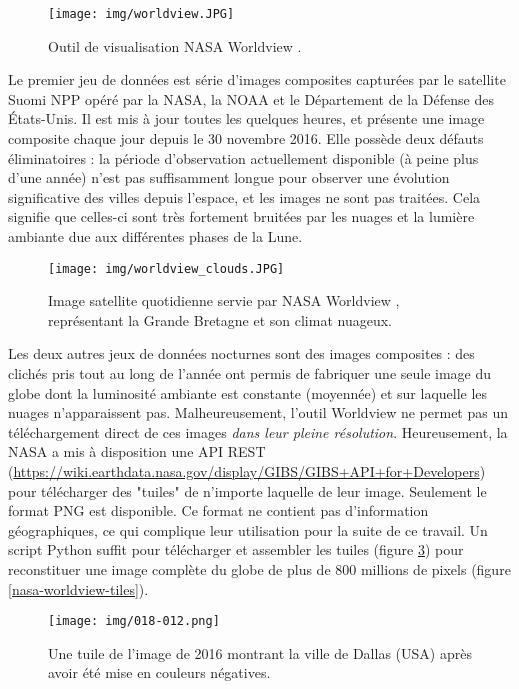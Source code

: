\documentclass[a4paper]{report}
\begin{document}
\begin{figure}[h]
	\centering
	\texttt{[image: img/worldview.JPG]}
	\caption{Outil de visualisation NASA Worldview \cite{nasa-worldview}.}
	\label{nasa-worldview-screenshot}
\end{figure}

Le premier jeu de données est série d'images composites capturées par le satellite Suomi NPP opéré par la NASA, la NOAA et le Département de la Défense des États-Unis. Il est mis à jour toutes les quelques heures, et présente une image composite chaque jour depuis le 30 novembre 2016. Elle possède deux défauts éliminatoires : la période d'observation actuellement disponible (à peine plus d'une année) n'est pas suffisamment longue pour observer une évolution significative des villes depuis l'espace, et les images ne sont pas traitées. Cela signifie que celles-ci sont très fortement bruitées par les nuages et la lumière ambiante due aux différentes phases de la Lune.

\begin{figure}[h]
	\centering
	\texttt{[image: img/worldview\_clouds.JPG]}
	\caption{Image satellite quotidienne servie par NASA Worldview \cite{nasa-worldview}, représentant la Grande Bretagne et son climat nuageux.}
	\label{nasa-worldview-daily}
\end{figure}

Les deux autres jeux de données nocturnes sont des images composites : des clichés pris tout au long de l'année ont permis de fabriquer une seule image du globe dont la luminosité ambiante est constante (moyennée) et sur laquelle les nuages n'apparaissent pas. Malheureusement, l'outil Worldview ne permet pas un téléchargement direct de ces images \textit{dans leur pleine résolution}. Heureusement, la NASA a mis à disposition une API REST (\url{https://wiki.earthdata.nasa.gov/display/GIBS/GIBS+API+for+Developers}) pour télécharger des "tuiles" de n'importe laquelle de leur image. Seulement le format PNG est disponible. Ce format ne contient pas d'information géographiques, ce qui complique leur utilisation pour la suite de ce travail. Un script Python suffit pour télécharger et assembler les tuiles (figure \ref{nasa-worldview-tile}) pour reconstituer une image complète du globe de plus de 800 millions de pixels (figure \ref{nasa-worldview-tiles}).

\begin{figure}[h]
	\centering
	\texttt{[image: img/018-012.png]}
	\caption{Une tuile de l'image de 2016 montrant la ville de Dallas (USA) après avoir été mise en couleurs négatives.}
	\label{nasa-worldview-tile}
\end{figure}
\end{document}
